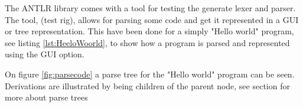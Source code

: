 The ANTLR library comes with a tool for testing the generate lexer and parser. The tool, (test rig), allows for parsing some code and get it represented
in a GUI or tree representation. This have been done for a simply "Hello world" program, see listing \ref{lst:HeeloWoorld}, to show how a program is parsed and represented using the GUI option.


On figure \ref{fig:parsecode} a parse tree for the "Hello world" program can be seen. Derivations are illustrated by being children of the parent node, see section  for more about parse trees